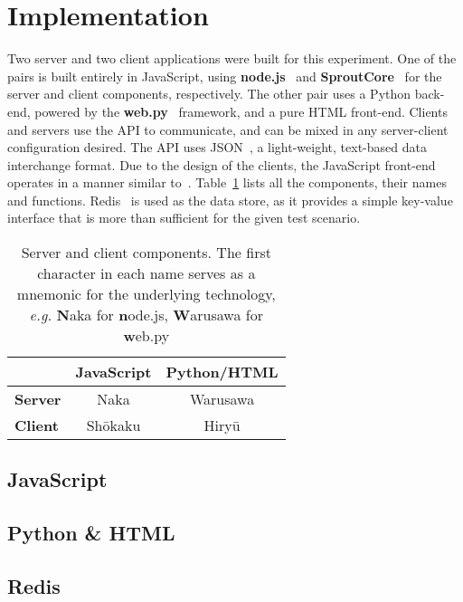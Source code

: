 \section{\label{sec:impl}Implementation}

Two server and two client applications were built for this experiment. One of the pairs is built entirely in JavaScript, using \textbf{node.js}~\cite{node} and \textbf{SproutCore}~\cite{sprout} for the server and client components, respectively. The other pair uses a Python back-end, powered by the \textbf{web.py}~\cite{webpy} framework, and a pure HTML front-end. Clients and servers use the API to communicate, and can be mixed in any server-client configuration desired. The API uses JSON~\cite{rfc4627}, a light-weight, text-based data interchange format. Due to the design of the clients, the JavaScript front-end operates in a manner similar to~\cite{flyhtml}. Table~\ref{tab:comps} lists all the components, their names and functions. Redis~\cite{redis} is used as the data store, as it provides a simple key-value interface that is more than sufficient for the given test scenario.

\begin{table}
    \begin{center}
        \begin{tabular}{l c c}
            \toprule
            & \textbf{JavaScript} & \textbf{Python/HTML} \\
            \midrule
            \textbf{Server} & Naka & Warusawa \\
            \textbf{Client} & Sh\={o}kaku & Hiry\={u}\\
            \bottomrule
        \end{tabular}
        \caption{Server and client components. The first character in each name serves as a mnemonic for the underlying technology, \emph{e.g.} \textbf{N}aka for \textbf{n}ode.js, \textbf{W}arusawa for \textbf{w}eb.py}
        \label{tab:comps}
    \end{center}
\end{table}

\subsection{\label{sec:impl:js}JavaScript}

\subsection{\label{sec:impl:pyhtml}Python \& HTML}

\subsection{\label{sec:impl:redis}Redis}